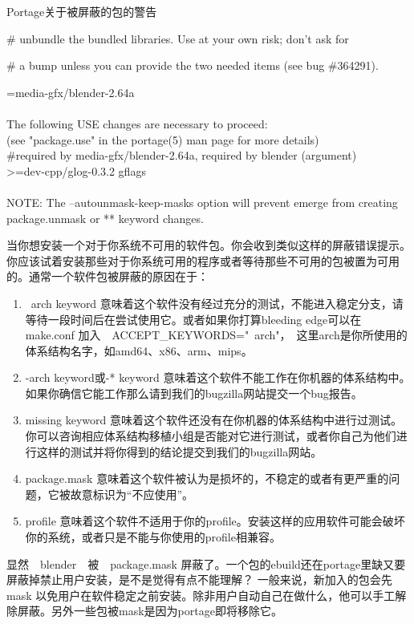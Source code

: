 \begin{enumerate}
\begin{example}{Portage关于被屏蔽的包的警告}
\begin{code}
\# unbundle the bundled libraries. Use at your own risk; don't ask for

\# a bump unless you can provide the two needed items (see bug \#364291).

=media-gfx/blender-2.64a\\
~\\
The following USE changes are necessary to proceed:\\
 (see "package.use" in the portage(5) man page for more details)\\
\#required by media-gfx/blender-2.64a, required by blender (argument)\\
>=dev-cpp/glog-0.3.2 gflags\\
~\\
NOTE: The --autounmask-keep-masks option will prevent emerge
      from creating package.unmask or ** keyword changes.
\end{code}

\end{example}

当你想安装一个对于你系统不可用的软件包。你会收到类似这样的屏蔽错误提示。你应该试着安装那些对于你系统可用的程序或者等待那些不可用的包被置为可用的。通常一个软件包被屏蔽的原因在于：

\begin{enumerate}

\item ~arch keyword 意味着这个软件没有经过充分的测试，不能进入稳定分支，请等待一段时间后在尝试使用它。或者如果你打算bleeding edge可以在　make.conf 加入　ACCEPT\_KEYWORDS="~arch"，　这里arch是你所使用的体系结构名字，如amd64、x86、arm、mips。

\item -arch keyword或-* keyword 意味着这个软件不能工作在你机器的体系结构中。如果你确信它能工作那么请到我们的bugzilla网站提交一个bug报告。
\item missing keyword 意味着这个软件还没有在你机器的体系结构中进行过测试。你可以咨询相应体系结构移植小组是否能对它进行测试，或者你自己为他们进行这样的测试并将你得到的结论提交到我们的bugzilla网站。
\item package.mask 意味着这个软件被认为是损坏的，不稳定的或者有更严重的问题，它被故意标识为“不应使用”。
\item profile 意味着这个软件不适用于你的profile。安装这样的应用软件可能会破坏你的系统，或者只是不能与你使用的profile相兼容。

\end{enumerate}

显然　blender　被　package.mask 屏蔽了。一个包的ebuild还在portage里缺又要屏蔽掉禁止用户安装，是不是觉得有点不能理解？
一般来说，新加入的包会先 mask 以免用户在软件稳定之前安装。除非用户自动自己在做什么，他可以手工解除屏蔽。另外一些包被mask是因为portage即将移除它。



\end{enumerate}
